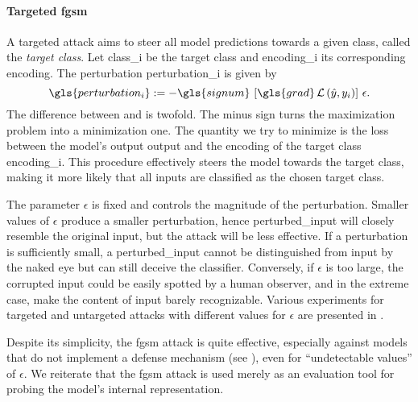\paragraph{Targeted \acrshort{fgsm}} A targeted attack aims to steer all model predictions towards a given class, called the \emph{target class}. Let \gls{class_i} be the target class and \gls{encoding_i} its corresponding encoding. The perturbation \gls{perturbation_i} is given by
\begin{equation}
  \gls{perturbation_i} :=
  - \gls{signum} \, \left[\gls{grad} \Loss\left(\hat{y}, y_i\right)\right] \, \epsilon.
  \label{eq:targeted-perturbation}
\end{equation}
The difference between  and  is twofold. The minus sign turns the maximization problem into a minimization one. The quantity we try to minimize is the loss between the model's output \gls{output} and the encoding of the target class \gls{encoding_i}. This procedure effectively steers the model towards the target class, making it more likely that all inputs are classified as the chosen target class.\medskip

The parameter $\epsilon$ is fixed and controls the magnitude of the perturbation. Smaller values of $\epsilon$ produce a smaller perturbation, hence \gls{perturbed_input} will closely resemble the original \gls{input}, but the attack will be less effective. If a perturbation is sufficiently small, a \gls{perturbed_input} cannot be distinguished from \gls{input} by the naked eye but can still deceive the classifier. Conversely, if $\epsilon$ is too large, the corrupted input could be easily spotted by a human observer, and in the extreme case, make the content of \gls{input} barely recognizable. Various experiments for targeted and untargeted attacks with different values for $\epsilon$ are presented in .\medskip

Despite its simplicity, the \gls{fgsm} attack is quite effective, especially against models that do not implement a defense mechanism (see ), even for ``undetectable values'' of $\epsilon$. We reiterate that the \gls{fgsm} attack is used merely as an evaluation tool for probing the model's internal representation.
